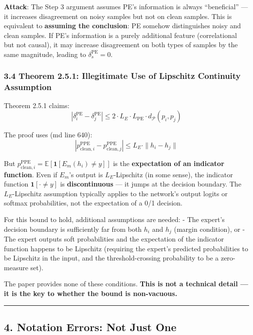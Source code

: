 \documentclass[
  12pt,
]{article}
\begin{document}
\textbf{Attack}: The Step 3 argument assumes PE's information is always ``beneficial'' --- it increases disagreement on noisy samples but not on clean samples. This is equivalent to \textbf{assuming the conclusion}: PE somehow distinguishes noisy and clean samples. If PE's information is a purely additional feature (correlational but not causal), it may increase disagreement on both types of samples by the same magnitude, leading to $\delta_s^{\text{PE}} = 0$.

\subsubsection{3.4 Theorem 2.5.1: Illegitimate Use of Lipschitz Continuity Assumption}\label{thm-2.5.1-lipschitz}

Theorem 2.5.1 claims:
\[|\delta_i^{\text{PE}} - \delta_j^{\text{PE}}| \leq 2 \cdot L_E \cdot L_{\text{PE}} \cdot d_{\mathcal{P}}(p_i, p_j)\]

The proof uses (md line 640):
\[|p_{\text{clean}, i}^{\text{PPE}} - p_{\text{clean}, j}^{\text{PPE}}| \leq L_E \cdot \|h_i - h_j\|\]

But $p_{\text{clean}, i}^{\text{PPE}} = \mathbb{E}[\mathbf{1}[E_m(h_i) \neq y]]$ is the \textbf{expectation of an indicator function}. Even if $E_m$'s output is $L_E$-Lipschitz (in some sense), the indicator function $\mathbf{1}[\cdot \neq y]$ is \textbf{discontinuous} --- it jumps at the decision boundary. The $L_E$-Lipschitz assumption typically applies to the network's output logits or softmax probabilities, not the expectation of a 0/1 decision.

For this bound to hold, additional assumptions are needed:
- The expert's decision boundary is sufficiently far from both $h_i$ and $h_j$ (margin condition), or
- The expert outputs soft probabilities and the expectation of the indicator function happens to be Lipschitz (requiring the expert's predicted probabilities to be Lipschitz in the input, and the threshold-crossing probability to be a zero-measure set).

The paper provides none of these conditions. \textbf{This is not a technical detail --- it is the key to whether the bound is non-vacuous.}

\begin{center}\rule{0.5\linewidth}{0.5pt}\end{center}

\subsection{4. Notation Errors: Not Just One}\label{notation-errors}
\end{document}
